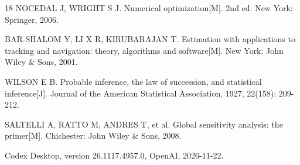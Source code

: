 \begin{thebibliography}{18}
 NOCEDAL J, WRIGHT S J. Numerical optimization[M]. 2nd ed. New York: Springer, 2006.

 BAR-SHALOM Y, LI X R, KIRUBARAJAN T. Estimation with applications to tracking and navigation: theory, algorithms and software[M]. New York: John Wiley \& Sons, 2001.

 WILSON E B. Probable inference, the law of succession, and statistical inference[J]. Journal of the American Statistical Association, 1927, 22(158): 209-212.

 SALTELLI A, RATTO M, ANDRES T, et al. Global sensitivity analysis: the primer[M]. Chichester: John Wiley \& Sons, 2008.

 Codex Desktop, version 26.1117.4957.0, OpenAI, 2026-11-22.

\end{thebibliography}
\endgroup

